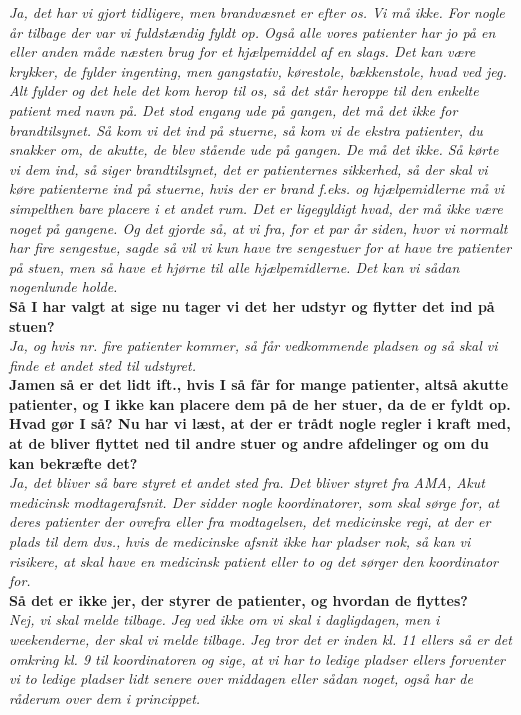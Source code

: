 \noindent
\textit{Ja, det har vi gjort tidligere, men brandvæsnet er efter os. Vi må ikke. For nogle år tilbage der var vi fuldstændig fyldt op. Også alle vores patienter har jo på en eller anden måde næsten brug for et hjælpemiddel af en slags. Det kan være krykker, de fylder ingenting, men gangstativ, kørestole, bækkenstole, hvad ved jeg. Alt fylder og det hele det kom herop til os, så det står heroppe til den enkelte patient med navn på. Det stod engang ude på gangen, det må det ikke for brandtilsynet. Så kom vi det ind på stuerne, så kom vi de ekstra patienter, du snakker om, de akutte, de blev stående ude på gangen. De må det ikke. Så kørte vi dem ind, så siger brandtilsynet, det er patienternes sikkerhed, så der skal vi køre patienterne ind på stuerne, hvis der er brand f.eks. og hjælpemidlerne må vi simpelthen bare placere i et andet rum. Det er ligegyldigt hvad, der må ikke være noget på gangene. Og det gjorde så, at vi fra, for et par år siden, hvor vi normalt har fire sengestue, sagde så vil vi kun have tre sengestuer for at have tre patienter på stuen, men så have et hjørne til alle hjælpemidlerne. Det kan vi sådan nogenlunde holde.}\\
\noindent
\textbf{Så I har valgt at sige nu tager vi det her udstyr og flytter det ind på stuen?}\\
\noindent
\textit{Ja, og hvis nr. fire patienter kommer, så får vedkommende pladsen og så skal vi finde et andet sted til udstyret.}\\
\noindent
\textbf{Jamen så er det lidt ift., hvis I så får for mange patienter, altså akutte patienter, og I ikke kan placere dem på de her stuer, da de er fyldt op. Hvad gør I så? Nu har vi læst, at der er trådt nogle regler i kraft med, at de bliver flyttet ned til andre stuer og andre afdelinger og om du kan bekræfte det?}\\
\noindent
\textit{Ja, det bliver så bare styret et andet sted fra. Det bliver styret fra AMA, Akut medicinsk modtagerafsnit. Der sidder nogle koordinatorer, som skal sørge for, at deres patienter der ovrefra eller fra modtagelsen, det medicinske regi, at der er plads til dem dvs., hvis de medicinske afsnit ikke har pladser nok, så kan vi risikere, at skal have en medicinsk patient eller to og det sørger den koordinator for.} \\
\noindent
\textbf{Så det er ikke jer, der styrer de patienter, og hvordan de flyttes?}\\
\noindent
\textit{Nej, vi skal melde tilbage. Jeg ved ikke om vi skal i dagligdagen, men i weekenderne, der skal vi melde tilbage. Jeg tror det er inden kl. 11 ellers så er det omkring kl. 9 til koordinatoren og sige, at vi har to ledige pladser ellers forventer vi to ledige pladser lidt senere over middagen eller sådan noget, også har de råderum over dem i princippet.}\\

